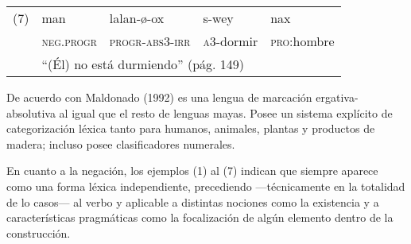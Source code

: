 {      %
      \noindent \begin{tabular}{lllll}
            (7) & man                                                     & lalan-ø-ox              & s-wey              & nax                 \\
                & \textsc{neg.progr}                                      & \textsc{progr-abs3-irr} & \textsc{a3}-dormir & \textsc{pro}:hombre \\
                & \multicolumn{4}{l}{“(Él) no está durmiendo” (pág. 149)}                                                                      \\
      \end{tabular} \vspace{0.3cm}
}

De acuerdo con Maldonado (1992) es una lengua de marcación ergativa-absolutiva al igual que el resto de lenguas mayas. Posee un sistema explícito de categorización léxica tanto para humanos, animales, plantas y productos de madera; incluso posee clasificadores numerales.

En cuanto a la negación, los ejemplos (1) al (7) indican que siempre aparece como una forma léxica independiente, precediendo —técnicamente en la totalidad de lo casos— al verbo y aplicable a distintas nociones como la existencia y a características pragmáticas como la focalización de algún elemento dentro de la construcción.
